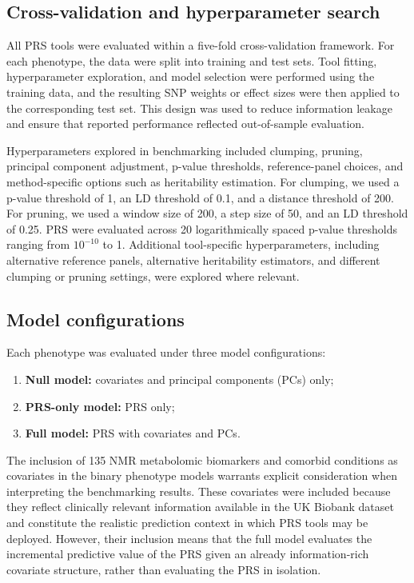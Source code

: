 \documentclass[pdflatex,sn-basic]{sn-jnl}
\begin{document}
\subsection*{Cross-validation and hyperparameter search}

All PRS tools were evaluated within a five-fold cross-validation framework. For each phenotype, the data were split into training and test sets. Tool fitting, hyperparameter exploration, and model selection were performed using the training data, and the resulting SNP weights or effect sizes were then applied to the corresponding test set. This design was used to reduce information leakage and ensure that reported performance reflected out-of-sample evaluation.

Hyperparameters explored in benchmarking included clumping, pruning, principal component adjustment, p-value thresholds, reference-panel choices, and method-specific options such as heritability estimation. For clumping, we used a p-value threshold of 1, an LD threshold of 0.1, and a distance threshold of 200. For pruning, we used a window size of 200, a step size of 50, and an LD threshold of 0.25. PRS were evaluated across 20 logarithmically spaced p-value thresholds ranging from $10^{-10}$ to 1. Additional tool-specific hyperparameters, including alternative reference panels, alternative heritability estimators, and different clumping or pruning settings, were explored where relevant.

\subsection*{Model configurations}

Each phenotype was evaluated under three model configurations:

\begin{enumerate}
    \item \textbf{Null model:} covariates and principal components (PCs) only;
    \item \textbf{PRS-only model:} PRS only;
    \item \textbf{Full model:} PRS with covariates and PCs.
\end{enumerate}

The inclusion of 135 NMR metabolomic biomarkers and comorbid conditions as covariates in the binary phenotype models warrants explicit consideration when interpreting the benchmarking results. These covariates were included because they reflect clinically relevant information available in the UK Biobank dataset and constitute the realistic prediction context in which PRS tools may be deployed. However, their inclusion means that the full model evaluates the incremental predictive value of the PRS given an already information-rich covariate structure, rather than evaluating the PRS in isolation.
\end{document}

